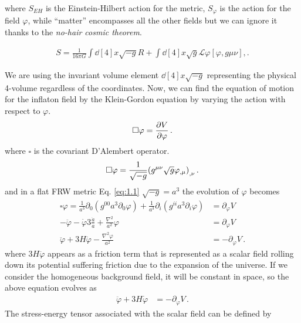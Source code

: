 where \(S_{EH}\) is the Einstein-Hilbert action for the metric, \(S_\varphi \) is the action for the field \(\varphi \), while ``matter'' encompasses all the other fields but we can ignore it thanks to the \emph{no-hair cosmic theorem}.

\begin{align}
    S = \frac{1}{16 \pi G} \int \dd[4]{x} \sqrt{-g} R + \int \dd[4]{x} \sqrt{g} \mathscr{L}\varphi [\varphi , g{\mu \nu }],. \label{2.10}
\end{align}

We are using the invariant volume element \(\dd[4]{x} \sqrt{-g}\)
representing the physical 4-volume regardless of the coordinates.
Now, we can find the equation of motion for the inflaton field by  the Klein-Gordon equation by varying the action with respect to $\varphi$.
\begin{align}
    \square \varphi = \pdv{V}{\varphi }\,. \label{2.11}
\end{align}
where $\square$ is the covariant D'Alembert operator.
\begin{align}
    \square \varphi = \frac{1}{\sqrt{-g}} \qty(g^{\mu \nu } \sqrt{g} \varphi_{, \mu })_{, \nu }\,.\label{2.12}
\end{align}
and in a flat FRW metric Eq. \ref{eq:1.1} $\sqrt{-g} = a^3$ the evolution of $\varphi$ becomes
\begin{align}
    \square \varphi = \frac{1}{a^3} \partial_0 (g^{00} a^3\partial_0\varphi) + \frac{1}{a^3} \partial_i (g^{ii} a^3\partial_i\varphi) 
    &= \partial _{\varphi} V  \\ - \ddot{\varphi} - \dot{\varphi} 3\frac{\dot{a}}{a} + \frac{\nabla^2}{a^2} \varphi  
    &= \partial _{\varphi} V  \\ \ddot{\varphi} + 3 H \dot{\varphi} - \frac{\nabla^2 \varphi }{a^2} &= - \partial _{\varphi} V\,. \label{2.15}
\end{align}
where $3H\ddot{\varphi}$ appears as a friction term that is represented as a scalar field rolling down its potential suffering friction due to the expansion of the universe. If we consider the homogeneous background field, it will be constant in space, so  the above equation evolves as\\
\begin{align}
     \ddot{\varphi} + 3 H \dot{\varphi}  &= - \partial _{\varphi} V\,. \label{2.16}
\end{align}
The stress-energy tensor associated with the scalar field can be defined by 

